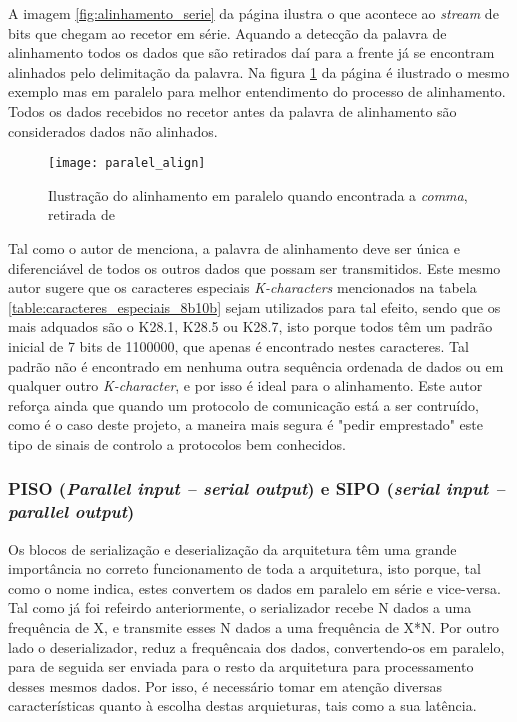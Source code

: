 A imagem \ref{fig:alinhamento_serie} da página \pageref{fig:alinhamento_serie} ilustra o que acontece ao \textit{stream} de bits que chegam ao recetor em série. Aquando a detecção da palavra de alinhamento todos os dados que são retirados daí para a frente já se encontram alinhados pelo delimitação da palavra. Na figura \ref{fig:alinhamento_paralelo} da página \pageref{fig:alinhamento_paralelo} é ilustrado o mesmo exemplo mas em paralelo para melhor entendimento do processo de alinhamento. Todos os dados recebidos no recetor antes da palavra de alinhamento são considerados dados não alinhados.
\begin{figure}[h!]
	\begin{center}
		\leavevmode
		\texttt{[image: paralel\_align]}
		\caption{Ilustração do alinhamento em paralelo quando encontrada a \textit{comma}, retirada de \cite{R011}}
		\label{fig:alinhamento_paralelo}
	\end{center}
\end{figure}

Tal como o autor de \cite{R032} menciona, a palavra de alinhamento deve ser única e diferenciável de todos os outros dados que possam ser transmitidos. Este mesmo autor sugere que os caracteres especiais \textit{K-characters} mencionados na tabela \ref{table:caracteres_especiais_8b10b} sejam utilizados para tal efeito, sendo que os mais adquados são o K28.1, K28.5 ou K28.7, isto porque todos têm um padrão inicial de 7 bits de 1100000, que apenas é encontrado nestes caracteres. Tal padrão não é encontrado em nenhuma outra sequência ordenada de dados ou em qualquer outro \textit{K-character}, e por isso é ideal para o alinhamento. Este autor reforça ainda que quando um protocolo de comunicação está a ser contruído, como é o caso deste projeto, a maneira mais segura é "pedir emprestado" este tipo de sinais de controlo a protocolos bem conhecidos.



\subsubsection*{PISO (\textit{Parallel input – serial output}) e SIPO (\textit{serial input – parallel output})}

Os blocos de serialização e deserialização da arquitetura têm uma grande importância no correto funcionamento de toda a arquitetura, isto porque, tal como o nome indica, estes convertem os dados em paralelo em série e vice-versa. Tal como já foi refeirdo anteriormente, o serializador recebe N dados a uma frequência de X, e transmite esses N dados a uma frequência de X*N. Por outro lado o deserializador, reduz a frequêncaia dos dados, convertendo-os em paralelo, para de seguida ser enviada para o resto da arquitetura para processamento desses mesmos dados. Por isso, é necessário tomar em atenção diversas características quanto à escolha destas arquieturas, tais como a sua latência.

